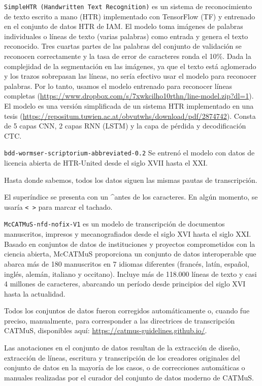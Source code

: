 \documentclass[11pt,a4paper]{article}
\begin{document}
\texttt{SimpleHTR (Handwritten Text Recognition)} es un sistema de reconocimiento de texto escrito a mano (HTR) implementado con TensorFlow (TF) y entrenado en el conjunto de datos HTR de IAM. El modelo toma imágenes de palabras individuales o líneas de texto (varias palabras) como entrada y genera el texto reconocido. Tres cuartas partes de las palabras del conjunto de validación se reconocen correctamente y la tasa de error de caracteres ronda el 10\%. Dada la complejidad de la segmentación en las imágenes, ya que el texto está aglomerado y los trazos sobrepasan las líneas, no sería efectivo usar el modelo para reconocer palabras. Por lo tanto, usamos el modelo entrenado para reconocer líneas completas (\url{https://www.dropbox.com/s/7xwkcilho10rthn/line-model.zip?dl=1}). El modelo es una versión simplificada de un sistema HTR implementado en una tesis (\url{https://repositum.tuwien.ac.at/obvutwhs/download/pdf/2874742}). Consta de 5 capas CNN, 2 capas RNN (LSTM) y la capa de pérdida y decodificación CTC.

\texttt{bdd-wormser-scriptorium-abbreviated-0.2} Se entrenó el modelo con datos de licencia abierta de HTR-United desde el siglo XVII hasta el XXI.

Hasta donde sabemos, todos los datos siguen las mismas pautas de transcripción.

El superíndice se presenta con un \textasciicircum antes de los caracteres. En algún momento, se usaría \texttt{< >} para marcar el tachado.

\texttt{McCATMuS-nfd-nofix-V1} es un modelo de transcripción de documentos manuscritos, impresos y mecanografiados desde el siglo XVI hasta el siglo XXI. Basado en conjuntos de datos de instituciones y proyectos comprometidos con la ciencia abierta, McCATMuS proporciona un conjunto de datos interoperable que abarca más de 180 manuscritos en 7 idiomas diferentes (francés, latín, español, inglés, alemán, italiano y occitano). Incluye más de 118.000 líneas de texto y casi 4 millones de caracteres, abarcando un período desde principios del siglo XVI hasta la actualidad.

Todos los conjuntos de datos fueron corregidos automáticamente o, cuando fue preciso, manualmente, para corresponder a las directrices de transcripción CATMuS, disponibles aquí: \url{https://catmus-guidelines.github.io/}.

Las anotaciones en el conjunto de datos resultan de la extracción de diseño, extracción de líneas, escritura y transcripción de los creadores originales del conjunto de datos en la mayoría de los casos, o de correcciones automáticas o manuales realizadas por el curador del conjunto de datos moderno de CATMuS.
\end{document}
